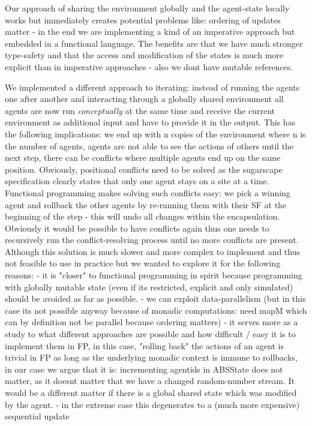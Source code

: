 Our approach of sharing the environment globally and the agent-state locally works but immediately creates potential problems like: ordering of updates matter - in the end we are implementing a kind of an imperative approach but embedded in a functional language. The benefits are that we have much stronger type-safety and that the access and modification of the states is much more explicit than in imperative approaches - also we dont have mutable references.

We implemented a different approach to iterating: instead of running the agents one after another and interacting through a globally shared environment all agents are now run \textit{conceptually} at the same time and receive the current environment as additional input and have to provide it in the output. This has the following implications: we end up with n copies of the environment where n is the number of agents, agents are not able to see the actions of others until the next step, there can be conflicts where multiple agents end up on the same position. 
Obviously, positional conflicts need to be solved as the sugarscape specification clearly states that only one agent stays on a site at a time. Functional programming makes solving such conflicts easy: we pick a winning agent and rollback the other agents by re-running them with their SF at the beginning of the step - this will undo all changes within the encapsulation. Obviously it would be possible to have conflicts again thus one needs to recursively run the conflict-resolving process until no more conflicts are present.
Although this solution is much slower and more complex to implement and thus not feasible to use in practice but we wanted to explore it for the following reasons:
- it is "closer" to functional programming in spirit because programming with globally mutable state (even if its restricted, explicit and only simulated) should be avoided as far as possible.
- we can exploit data-parallelism (but in this case its not possible anyway because of monadic computations: need mapM which can by definition not be parallel because ordering matters)
- it serves more as a study to what different approaches are possible and how difficult / easy it is to implement them in FP, in this case, "rolling back" the actions of an agent is trivial in FP as long as the underlying monadic context is immune to rollbacks, in our case we argue that it is: incrementing agentids in ABSState does not matter, as it doesnt matter that we have a changed random-number stream. It would be a different matter if there is a global shared state which was modified by the agent.
- in the extreme case this degenerates to a (much more expensive) sequential update 

